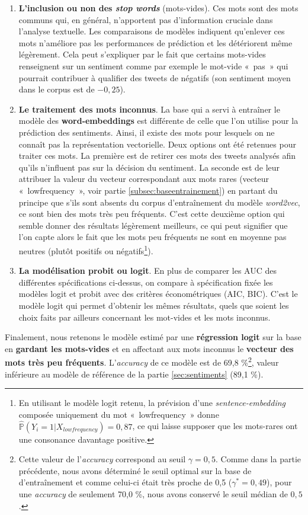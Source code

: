\documentclass[11pt,french,french]{article}
\let\rmarkdownfootnote\footnote%
\def\footnote{\protect\rmarkdownfootnote}
\begin{document}
\begin{enumerate}
\item \textbf{L’inclusion ou non des \emph{stop words}} (mots-vides). 
Ces mots sont des mots communs qui, en général, n’apportent pas d’information cruciale dans l’analyse textuelle. 
Les comparaisons de modèles indiquent qu’enlever ces mots n’améliore pas les performances de prédiction et les détériorent même légèrement. 
Cela peut s’expliquer par le fait que certains mots-vides renseignent sur un sentiment comme par exemple le mot-vide « pas » qui pourrait contribuer à qualifier des tweets de négatifs (son sentiment moyen dans le corpus est de $-0,25$).

\item \textbf{Le traitement des mots inconnus}. 
La base qui a servi à entraîner le modèle des \textbf{word-embeddings} est différente de celle que l'on utilise pour la prédiction des sentiments.
Ainsi, il existe des mots pour lesquels on ne connaît pas la représentation vectorielle. 
Deux options ont été retenues pour traiter ces mots. 
La première est de retirer ces mots des tweets analysés afin qu'ils n’influent pas sur la décision du sentiment. 
La seconde est de leur attribuer la valeur du vecteur correspondant aux mots rares (vecteur « lowfrequency », voir partie \ref{subsec:baseentrainement}) en partant du principe que s'ils sont absents du corpus d'entraînement du modèle \emph{word2vec}, ce sont bien des mots très peu fréquents. 
C’est cette deuxième option qui semble donner des résultats légèrement meilleurs, ce qui peut signifier que l’on capte alors le fait que les mots peu fréquents ne sont en moyenne pas neutres (plutôt positifs ou négatifs\footnote{En utilisant le modèle logit retenu, la prévision d'une \emph{sentence-embedding} composée uniquement du mot « lowfrequency » donne $\widehat{\mathbb{P}}(Y_i = 1 | X_{lowfrequency}) = 0,87$, ce qui laisse supposer que les mots-rares ont une consonance davantage positive.}). 

\item \textbf{La modélisation probit ou logit}. En plus de comparer les AUC des différentes spécifications ci-dessus,  on compare à spécification fixée les modèles logit et probit avec des critères économétriques (AIC, BIC). C’est le modèle logit qui permet d’obtenir les mêmes résultats, quels que soient les choix faits par ailleurs concernant les mot-vides et les mots inconnus.

\end{enumerate}

Finalement, nous retenons le modèle estimé par une \textbf{régression
logit} sur la base en \textbf{gardant les mots-vides} et en affectant
aux mots inconnus le \textbf{vecteur des mots très peu fréquents}.
L'\emph{accuracy} de ce modèle est de 69,8 \%\footnote{Cette valeur de
  l'\emph{accuracy} correspond au seuil \(\gamma = 0,5\). Comme dans la
  partie précédente, nous avons déterminé le seuil optimal sur la base
  de d'entraînement et comme celui-ci était très proche de 0,5
  (\(\gamma^* = 0,49\)), pour une \emph{accuracy} de seulement 70,0 \%,
  nous avons conservé le seuil médian de \(0,5\).}, valeur inférieure au
modèle de référence de la partie \ref{sec:sentiments} (89,1 \%).
\end{document}
